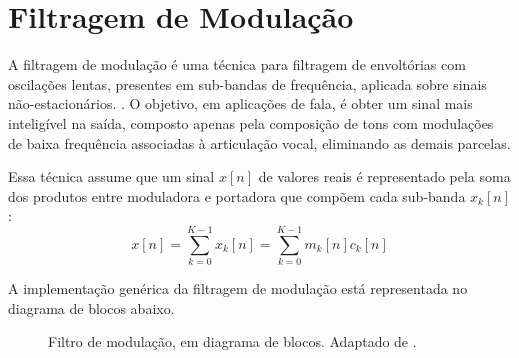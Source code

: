 \section{Filtragem de Modulação} \label{section_fil_mod}
A filtragem de modulação é uma técnica para filtragem de envoltórias com
oscilações lentas, presentes em sub-bandas de frequência, aplicada sobre sinais
não-estacionários.\cite{clark2009sum} \cite{li2005properties}. O objetivo, em
aplicações de fala, é obter um sinal mais inteligível na saída, composto apenas
pela composição de tons com modulações de baixa frequência associadas à
articulação vocal, eliminando as demais parcelas.

Essa técnica assume que um sinal $x[n]$ de valores reais é
representado pela soma dos produtos entre moduladora e portadora que compõem
cada sub-banda $x_k[n]$:
\begin{equation}
    x[n] = \sum_{k = 0}^{K - 1} x_k[n] = \sum_{k = 0}^{K - 1} m_k[n] c_k[n]
\end{equation}


A implementação genérica da filtragem de modulação está representada no diagrama de blocos abaixo.

\begin{figure}[h]
    \centering
    \caption{Filtro de modulação, em diagrama de blocos. Adaptado de \cite{li2005properties}.}
\end{figure}

